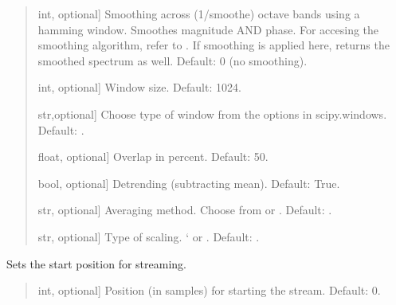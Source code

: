 \documentclass[letterpaper,10pt,english]{sphinxmanual}
\begin{document}
\begin{fulllineitems}
\begin{fulllineitems}
\begin{quote}
\begin{description}
\begin{description}
\sphinxlineitem{\sphinxstylestrong{smoothe}}{[}int, optional{]}
\sphinxAtStartPar
Smoothing across (1/smoothe) octave bands using a hamming
window. Smoothes magnitude AND phase. For accesing the smoothing
algorithm, refer to
.
If smoothing is applied here,  returns
the smoothed spectrum as well.
Default: 0 (no smoothing).

\sphinxlineitem{\sphinxstylestrong{window\_length\_samples}}{[}int, optional{]}
\sphinxAtStartPar
Window size. Default: 1024.

\sphinxlineitem{\sphinxstylestrong{window\_type}}{[}str,optional{]}
\sphinxAtStartPar
Choose type of window from the options in scipy.windows.
Default: .

\sphinxlineitem{\sphinxstylestrong{overlap\_percent}}{[}float, optional{]}
\sphinxAtStartPar
Overlap in percent. Default: 50.

\sphinxlineitem{\sphinxstylestrong{detrend}}{[}bool, optional{]}
\sphinxAtStartPar
Detrending (subtracting mean). Default: True.

\sphinxlineitem{\sphinxstylestrong{average}}{[}str, optional{]}
\sphinxAtStartPar
Averaging method. Choose from  or .
Default: .

\sphinxlineitem{\sphinxstylestrong{scaling}}{[}str, optional{]}
\sphinxAtStartPar
Type of scaling. ‘ or . Default: .

\end{description}

\end{description}\end{quote}

\end{fulllineitems}


\begin{fulllineitems}
\label{\detokenize{classes:dsptoolbox.classes.signal_class.Signal.set_streaming_position}}
\pysigstartsignatures
{}
\pysigstopsignatures
\sphinxAtStartPar
Sets the start position for streaming.
\begin{quote}\begin{description}
\begin{description}
\sphinxlineitem{\sphinxstylestrong{position\_samples}}{[}int, optional{]}
\sphinxAtStartPar
Position (in samples) for starting the stream. Default: 0.


\end{description}
\end{description}
\end{quote}
\end{fulllineitems}
\end{fulllineitems}
\end{document}
